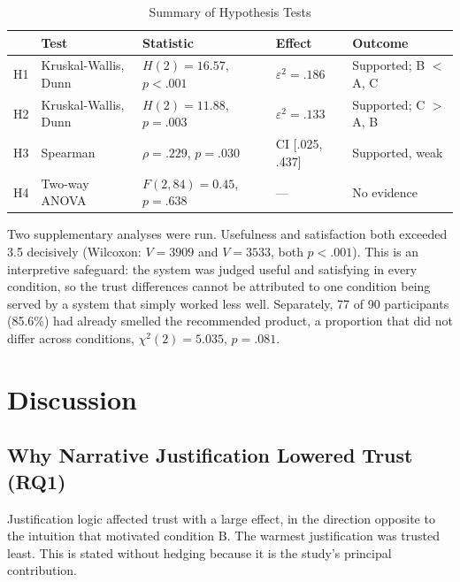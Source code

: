 \documentclass[conference]{IEEEtran}
\begin{document}
\begin{table}[htbp]
\caption{Summary of Hypothesis Tests}
\begin{center}
\renewcommand{\arraystretch}{1.1}
\setlength{\tabcolsep}{3.4pt}
\begin{tabular}{@{}p{0.5cm}p{2.35cm}p{1.75cm}p{0.95cm}p{1.35cm}@{}}
\toprule
& \textbf{Test} & \textbf{Statistic} & \textbf{Effect} & \textbf{Outcome} \\
\midrule
H1 & Kruskal-Wallis, Dunn & $H(2)=16.57$, $p<.001$ & $\varepsilon^{2}=.186$ & Supported; B $<$ A, C \\
H2 & Kruskal-Wallis, Dunn & $H(2)=11.88$, $p=.003$ & $\varepsilon^{2}=.133$ & Supported; C $>$ A, B \\
H3 & Spearman & $\rho=.229$, $p=.030$ & CI [.025, .437] & Supported, weak \\
H4 & Two-way ANOVA & $F(2,84)=0.45$, $p=.638$ & --- & No evidence \\
\bottomrule
\end{tabular}
\label{tab:hyp}
\end{center}
\end{table}

Two supplementary analyses were run. Usefulness and satisfaction both exceeded 3.5
decisively (Wilcoxon: $V = 3909$ and $V = 3533$, both $p < .001$). This is an interpretive
safeguard: the system was judged useful and satisfying in every condition, so the trust
differences cannot be attributed to one condition being served by a system that simply
worked less well. Separately, 77 of 90 participants (85.6\%) had already smelled the
recommended product, a proportion that did not differ across conditions,
$\chi^{2}(2) = 5.035$, $p = .081$.

\section{Discussion}
\label{sec:discussion}

\subsection{Why Narrative Justification Lowered Trust (RQ1)}

Justification logic affected trust with a large effect, in the direction opposite to the
intuition that motivated condition B. The warmest justification was trusted least. This is
stated without hedging because it is the study's principal contribution.
\end{document}
